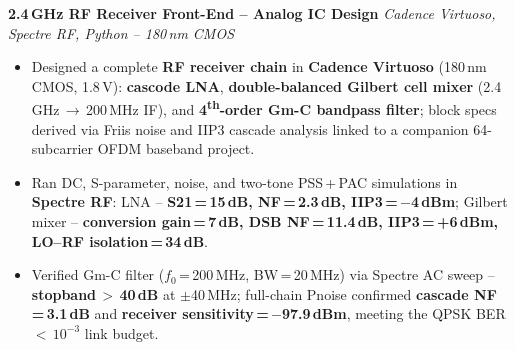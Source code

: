 
\textbf{2.4\,GHz RF Receiver Front-End -- Analog IC Design} \hfill
{\small\textit{Cadence Virtuoso, Spectre RF, Python -- 180\,nm CMOS}}
\begin{itemize}

    \item Designed a complete \textbf{RF receiver chain} in \textbf{Cadence Virtuoso} (180\,nm CMOS, 1.8\,V): \textbf{cascode LNA}, \textbf{double-balanced Gilbert cell mixer} (2.4\,GHz\,$\to$\,200\,MHz IF), and \textbf{4\textsuperscript{th}-order Gm-C bandpass filter}; block specs derived via Friis noise and IIP3 cascade analysis linked to a companion 64-subcarrier OFDM baseband project.

    \item Ran DC, S-parameter, noise, and two-tone PSS\,+\,PAC simulations in \textbf{Spectre RF}: LNA -- \textbf{S21\,=\,15\,dB, NF\,=\,2.3\,dB, IIP3\,=\,$-$4\,dBm}; Gilbert mixer -- \textbf{conversion gain\,=\,7\,dB, DSB NF\,=\,11.4\,dB, IIP3\,=\,+6\,dBm, LO--RF isolation\,=\,34\,dB}.

    \item Verified Gm-C filter ($f_0$\,=\,200\,MHz, BW\,=\,20\,MHz) via Spectre AC sweep -- \textbf{stopband\,$>$\,40\,dB} at $\pm$40\,MHz; full-chain Pnoise confirmed \textbf{cascade NF\,=\,3.1\,dB} and \textbf{receiver sensitivity\,=\,$-$97.9\,dBm}, meeting the QPSK BER\,$<$\,$10^{-3}$ link budget.

\end{itemize}



%
%
%
